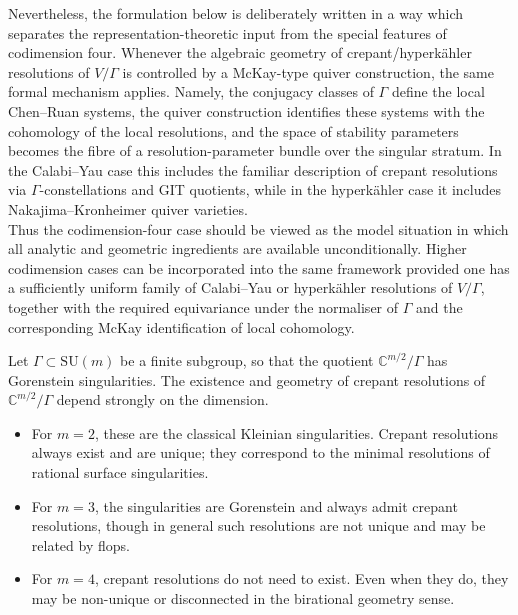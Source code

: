 \documentclass[psamsfonts]{amsart}
\theoremstyle{plain}
\theoremstyle{definition}{
\newtheorem{defi}{Definition}[section]
\newtheorem{ass}{Assumption}
\newtheorem*{nota}{Notation}}
\theoremstyle{remark}{
\newtheorem{rem}{Remark}
\newtheorem{ex}{Example}}
\theoremstyle{plain}{
\newtheorem{thm}{Theorem}[section]
\newtheorem{lem}{Lemma}[section]
\newtheorem{cor}{Corollary}[section]
\newtheorem{prop}{Proposition}[section]
\newtheorem{con}{Conjecture}[section]}
\newcommand{\m}[1]{{\mathrm{#1}}}
\begin{document}
Nevertheless, the formulation below is deliberately written in a way which separates the representation-theoretic input from the special features of codimension four. Whenever the algebraic geometry of crepant/hyperkähler resolutions of $V/\Gamma$ is controlled by a McKay-type quiver construction, the same formal mechanism applies. Namely, the conjugacy classes of $\Gamma$
define the local Chen--Ruan systems, the quiver construction identifies these systems with the cohomology of the local resolutions, and the space of stability parameters becomes the fibre of a resolution-parameter bundle over the singular stratum. In the Calabi--Yau case this includes the familiar description of crepant resolutions via $\Gamma$-constellations and GIT quotients, while in the hyperkähler case it includes Nakajima--Kronheimer
quiver varieties.\\

Thus the codimension-four case should be viewed as the model situation in which all analytic and geometric ingredients are available unconditionally. Higher codimension cases can be incorporated into the same framework provided one has a sufficiently uniform family of Calabi--Yau or hyperkähler resolutions of $V/\Gamma$, together with the required equivariance under the normaliser of $\Gamma$ and the corresponding McKay identification of local cohomology.




\begin{rem}
Let $\Gamma \subset \m{SU}(m)$ be a finite subgroup, so that the quotient $\mathbb{C}^{m/2}/\Gamma$ has Gorenstein singularities. The existence and geometry of crepant resolutions of $\mathbb{C}^{m/2}/\Gamma$ depend strongly on the dimension.
\begin{itemize}
    \item For $m = 2$, these are the classical Kleinian singularities. Crepant resolutions always exist and are unique; they correspond to the minimal resolutions of rational surface singularities.
    \item For $m = 3$, the singularities are Gorenstein and always admit crepant resolutions, though in general such resolutions are not unique and may be related by flops. 
    \item For $m = 4$, crepant resolutions do not need to exist. Even when they do, they may be non-unique or disconnected in the birational geometry sense.
\end{itemize}
\end{rem}
\end{document}

